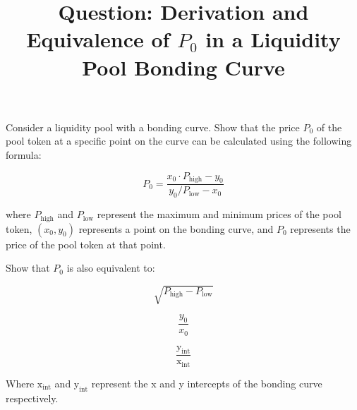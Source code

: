 \documentclass{article}
\begin{document}
\title{Question: Derivation and Equivalence of \( P_0 \) in a Liquidity Pool Bonding Curve}
\author{}
\date{}
\maketitle

Consider a liquidity pool with a bonding curve. Show that the price \( P_0 \) of the pool token at a specific point on the curve can be calculated using the following formula:

\[ 
P_0 = \frac{{x_0 \cdot P_{\text{high}} - y_0}}{{y_0/P_{\text{low}} - x_0}} 
\]

where \( P_{\text{high}} \) and \( P_{\text{low}} \) represent the maximum and minimum prices of the pool token, \( (x_0, y_0) \) represents a point on the bonding curve, and \( P_0 \) represents the price of the pool token at that point.

Show that \( P_0 \) is also equivalent to:

\[ 
\sqrt{{P_{\text{high}} - P_{\text{low}}}} 
\]

\[ 
\frac{{y_0}}{{x_0}} 
\]

\[ 
\frac{{\text{y}_{\text{int}}}}{{\text{x}_{\text{int}}}} 
\]

Where \( \text{x}_{\text{int}} \) and \( \text{y}_{\text{int}} \) represent the x and y intercepts of the bonding curve respectively.
\end{document}
